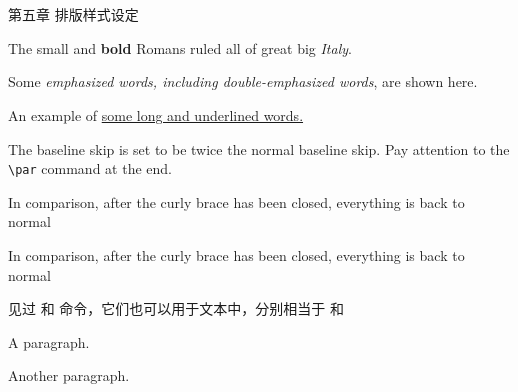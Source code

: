 \documentclass[UTF8]{ctexart}
\title{}
\author{}
\begin{document}
	\section{}


	第五章 排版样式设定


		{\small The small and
	\textbf{bold} Romans ruled}
		{\Large all of great big
		{\itshape Italy}.}






	Some \emph{emphasized words,
		including \emph{double-emphasized}
		words}, are shown here.

	An example of \uline{some long and underlined words.}


	{\linespread{2.0}\selectfont
	The baseline skip is set to be
	twice the normal baseline skip.
	Pay attention to the \verb|\par|
	command at the end. \par}
	In comparison, after the
	curly brace has been closed,
	everything is back to normal

	\setlength{\parskip}{1ex plus 0.5ex minus 0.2ex}
	In comparison, after the
	curly brace has been closed,
	everything is back to normal

	见过 \quad 和 \qquad 命令，它们也可以用于文本中，分别相当于
	\hspace{1em} 和 \hspace{2em}


	A paragraph.

	\vspace{2ex}
	Another paragraph.
\end{document}

